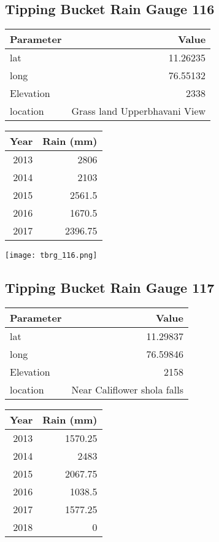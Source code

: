 \documentclass[a4paper]{article}
\begin{document}
\subsection*{Tipping Bucket Rain Gauge 116}
\label{sec:orgfdc6bbc}

\begin{center}
\begin{tabular}{lr}
Parameter & Value\\
\hline
lat & 11.26235\\
long & 76.55132\\
Elevation & 2338\\
location & Grass land Upperbhavani View\\
\end{tabular}
\end{center}

\begin{center}
\begin{tabular}{rr}
Year & Rain (mm)\\
\hline
2013 & 2806\\
2014 & 2103\\
2015 & 2561.5\\
2016 & 1670.5\\
2017 & 2396.75\\
\end{tabular}
\end{center}

\begin{center}
\texttt{[image: tbrg\_116.png]}
\end{center}

\newpage

\subsection*{Tipping Bucket Rain Gauge 117}
\label{sec:org9803d4c}

\begin{center}
\begin{tabular}{lr}
Parameter & Value\\
\hline
lat & 11.29837\\
long & 76.59846\\
Elevation & 2158\\
location & Near Califlower shola falls\\
\end{tabular}
\end{center}

\begin{center}
\begin{tabular}{rr}
Year & Rain (mm)\\
\hline
2013 & 1570.25\\
2014 & 2483\\
2015 & 2067.75\\
2016 & 1038.5\\
2017 & 1577.25\\
2018 & 0\\
\end{tabular}
\end{center}
\end{document}
